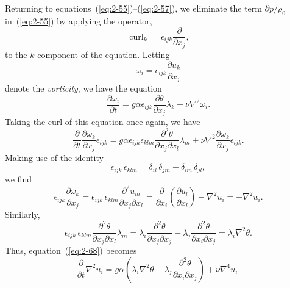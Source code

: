 Returning to equations~(\ref{eq:2-55})--(\ref{eq:2-57}), we eliminate the term $\partial p/\rho_0$ in~(\ref{eq:2-55}) by applying the operator,
\begin{equation}
\label{eq:2-65}
\operatorname{curl}_k = \epsilon_{ijk}\frac{\partial}{\partial x_j},
\end{equation}
to the $k$-component of the equation. Letting
\begin{equation}
\label{eq:2-66}
\omega_i = \epsilon_{ijk}\frac{\partial u_k}{\partial x_j}
\end{equation}
denote the \emph{vorticity}, we have the equation
\begin{equation}
\label{eq:2-67}
\frac{\partial\omega_i}{\partial t} = g\alpha\epsilon_{ijk}\frac{\partial\theta}{\partial x_j}\lambda_k + \nu\nabla^2\omega_i.
\end{equation}
Taking the curl of this equation once again, we have
\begin{equation}
\label{eq:2-68}
\frac{\partial}{\partial t}\frac{\partial\omega_k}{\partial x_j}\epsilon_{ijk} = g\alpha\epsilon_{ijk}\epsilon_{klm}\frac{\partial^2\theta}{\partial x_j\partial x_l}\lambda_m + \nu\nabla^2\frac{\partial\omega_k}{\partial x_j}\epsilon_{ijk}.
\end{equation}
Making use of the identity
\begin{equation}
\label{eq:2-69}
\epsilon_{ijk}\,\epsilon_{klm} = \delta_{il}\,\delta_{jm} - \delta_{im}\,\delta_{jl},
\end{equation}
we find
\begin{equation}
\label{eq:2-70}
\epsilon_{ijk}\frac{\partial\omega_k}{\partial x_j} = \epsilon_{ijk}\,\epsilon_{klm}\frac{\partial^2 u_m}{\partial x_j\partial x_l} = \frac{\partial}{\partial x_i}\!\left(\frac{\partial u_l}{\partial x_l}\right) - \nabla^2 u_i = -\nabla^2 u_i.
\end{equation}
Similarly,
\begin{equation}
\label{eq:2-71}
\epsilon_{ijk}\,\epsilon_{klm}\frac{\partial^2\theta}{\partial x_j\partial x_l}\lambda_m = \lambda_i\frac{\partial^2\theta}{\partial x_j\partial x_j} - \lambda_j\frac{\partial^2\theta}{\partial x_i\partial x_j} = \lambda_i\nabla^2\theta.
\end{equation}
Thus, equation~(\ref{eq:2-68}) becomes
\begin{equation}
\label{eq:2-72}
\frac{\partial}{\partial t}\nabla^2 u_i = g\alpha\!\left(\lambda_i\nabla^2\theta - \lambda_j\frac{\partial^2\theta}{\partial x_i\partial x_j}\right) + \nu\nabla^4 u_i.
\end{equation}


